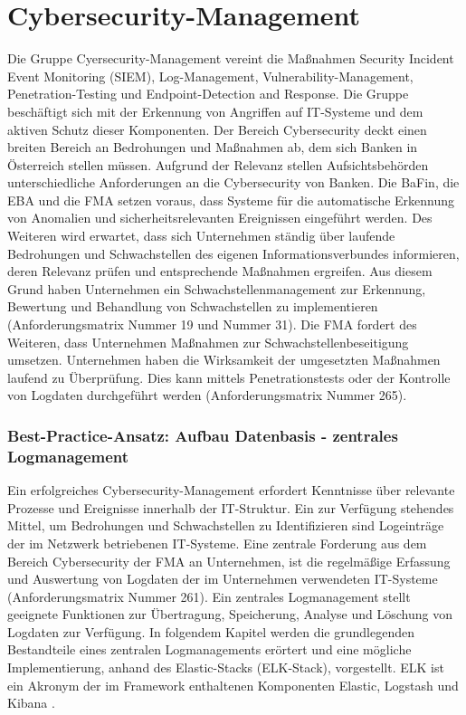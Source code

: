 \section{Cybersecurity-Management}
\label{Vulnerability-Management}
Die Gruppe \glqq{}Cyersecurity-Management\grqq{} vereint die Maßnahmen \glqq{}Security Incident Event Monitoring\grqq{} (SIEM), \glqq{}Log-Management\grqq{}, \glqq{}Vulnerability-Management\grqq{}, \\\glqq{}Penetration-Testing\grqq{} und \glqq{}Endpoint-Detection and Response\grqq{}. Die Gruppe beschäftigt sich mit der Erkennung von Angriffen auf IT-Systeme und dem aktiven Schutz dieser Komponenten.
\bigbreak
Der Bereich \glqq{}Cybersecurity\grqq{} deckt einen breiten Bereich an Bedrohungen und Maßnahmen ab, dem sich Banken in Österreich stellen müssen. Aufgrund der Relevanz stellen Aufsichtsbehörden unterschiedliche Anforderungen an die Cybersecurity von Banken. Die BaFin, die EBA und die FMA setzen voraus, dass Systeme für die automatische Erkennung von Anomalien und sicherheitsrelevanten Ereignissen eingeführt werden. Des Weiteren wird erwartet, dass sich Unternehmen ständig über laufende Bedrohungen und Schwachstellen des eigenen Informationsverbundes informieren, deren Relevanz prüfen und entsprechende Maßnahmen ergreifen. Aus diesem Grund haben Unternehmen ein Schwachstellenmanagement zur Erkennung, Bewertung und Behandlung von Schwachstellen zu implementieren (Anforderungsmatrix Nummer 19 und Nummer 31). Die FMA fordert des Weiteren, dass Unternehmen Maßnahmen zur Schwachstellenbeseitigung umsetzen. Unternehmen haben die Wirksamkeit der umgesetzten Maßnahmen laufend zu Überprüfung. Dies kann mittels Penetrationstests oder der Kontrolle von Logdaten durchgeführt werden (Anforderungsmatrix Nummer 265). 
\bigbreak
\subsubsection{Best-Practice-Ansatz: Aufbau Datenbasis - zentrales Logmanagement}
Ein erfolgreiches Cybersecurity-Management erfordert Kenntnisse über relevante Prozesse und Ereignisse innerhalb der IT-Struktur. Ein zur Verfügung stehendes Mittel, um Bedrohungen und Schwachstellen zu Identifizieren sind Logeinträge der im Netzwerk betriebenen IT-Systeme. Eine zentrale Forderung aus dem Bereich Cybersecurity der FMA an Unternehmen, ist die regelmäßige Erfassung und Auswertung von Logdaten der im Unternehmen verwendeten IT-Systeme (Anforderungsmatrix Nummer 261). Ein zentrales Logmanagement stellt geeignete Funktionen zur Übertragung, Speicherung, Analyse und Löschung von Logdaten zur Verfügung. 
\bigbreak
In folgendem Kapitel werden die grundlegenden Bestandteile eines zentralen Logmanagements erörtert und eine mögliche Implementierung, anhand des \glqq{}Elastic-Stacks\grqq{} (ELK-Stack), vorgestellt. \glqq{}ELK\grqq{} ist ein Akronym der im Framework enthaltenen Komponenten \glqq{}Elastic\grqq{}, \glqq{}Logstash\grqq{} und \glqq{}Kibana\grqq{} \autocite{ELK_Stack}.
\bigbreak

